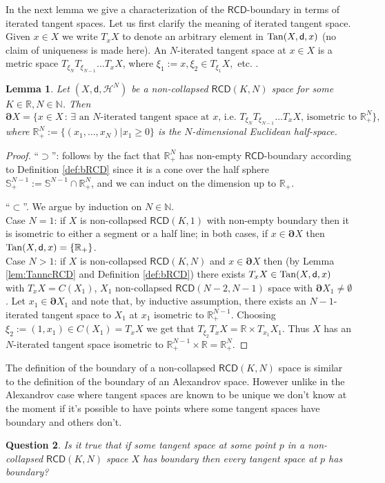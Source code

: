 \documentclass[a4paper]{amsart}
\newcounter{assu}
\theoremstyle{plain}
\newtheorem{lemma}{Lemma}[section]
\newtheorem{question}[lemma]{Question}
\theoremstyle{definition}
\numberwithin{equation}{section}
\newcommand{\R}{\mathbb{R}}
\newcommand{\bS}{\mathbb{S}}
\newcommand{\N}{\mathbb{N}}
\newcommand{\RCD}{\mathsf{RCD}}
\newcommand{\Tan}{{\rm Tan}}
\newcommand{\sfd}{\mathsf d}
\newcommand{\cH}{\mathcal{H}}
\newcommand{\bRCD}{\boldsymbol\partial}
\begin{document}
{{

In the next lemma we give a characterization of the $\RCD$-boundary in terms of iterated tangent spaces.  Let us first clarify the meaning of iterated tangent space. Given $x\in X$ we write $T_{x}X$ to denote an arbitrary element in $\Tan(X,\sfd,x)$ (no claim of uniqueness is made here). An $N$-iterated tangent space at $x\in X$ is a metric space   $T_{\xi_N}T_{\xi_{N-1}}\ldots T_{x} X$, where $\xi_1:=x, \xi_2\in T_{\xi_1}X,$ etc. .

\begin{lemma}\label{lem:bRCDXIteratedTang}
Let $(X,\sfd,\cH^{N})$ be a non-collapsed $\RCD(K,N)$ space for some $K\in \R, N\in \N$. Then
\begin{equation}\label{eq:bRCDTangents}
\bRCD X=\{ x\in X \,:\, \exists \text{ an $N$-iterated tangent space  at $x$, i.e. $T_{\xi_N}T_{\xi_{N-1}}\ldots T_{x} X$, isometric to  $\R^N_+$}\},
\end{equation}
where  $\R^N_+:=\{(x_1,\ldots,x_N)| x_1\ge 0\}$ is the $N$-dimensional Euclidean half-space.
\end{lemma}

\begin{proof}
``$\supset$'': follows by the fact that  $\R^N_+$ has non-empty $\RCD$-boundary according to Definition \ref{def:bRCD} since it is a cone over the half sphere $\bS^{N-1}_{+}:=\bS^{N-1} \cap \R^{N}_{+}$, and we can induct on the dimension up to $\R_{+}$.

``$\subset$''. We argue by induction on $N\in \N$. 
\\ Case $N=1$: if $X$ is non-collapsed $\RCD(K,1)$ with non-empty boundary then it is isometric to either a segment or a half line; in both cases, if  $x\in \bRCD X$ then $\Tan(X,\sfd,x)=\{\R_{+}\}$. 
\\ Case $N>1$: if $X$ is non-collapsed $\RCD(K,N)$ and $x\in \bRCD X$ then (by Lemma \ref{lem:TanncRCD} and  Definition \ref{def:bRCD}) there exists $T_{x}X \in \Tan(X,\sfd,x)$ with $T_{x}X=C(X_{1})$, $X_{1}$ non-collapsed $\RCD(N-2,N-1)$ space with $\bRCD X_{1} \neq \emptyset$. Let $x_{1}\in \bRCD X_{1}$ and note that, by inductive assumption, there exists an $N-1$-iterated tangent space  to $X_{1}$ at $x_{1}$ isometric to $\R^{N-1}_{+}$. Choosing $\xi_{2}:=(1,x_{1})\in C(X_{1})=T_{x}X$ we get that $T_{\xi_{2}}T_{x}X=\R\times T_{x_{1}}X_{1}$. Thus $X$ has an $N$-iterated tangent space isometric to $\R^{N-1}_{+}\times \R=\R^{N}_{+}$.
\end{proof}
}

The definition of the boundary of a non-collapsed $\RCD(K,N)$ space is similar to the definition of the boundary of an Alexandrov space. However  unlike in the Alexandrov case where tangent  spaces are known to be unique we don't know at the moment if it's possible to have points where some tangent  spaces have boundary and others don't.
\begin{question}\label{q:boundTan}
Is it true that if \emph{some} tangent space at  some point $p$ in a non-collapsed $\RCD(K,N)$ space $X$ has boundary then \emph{every} tangent space at $p$ has boundary?
\end{question}

}
\end{document}
